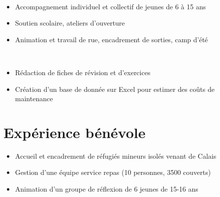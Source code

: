 \documentclass[]{cv-template}
\begin{document}
\begin{minipage}[t]{0.65\textwidth}
 \\
\begin{itemize}
\item Accompagnement individuel et collectif de jeunes de 6 à 15 ans
\item Soutien scolaire, ateliers d'ouverture
\item Animation et travail de rue, encadrement de sorties, camp d'été
\end{itemize}
\sectionsep

\\
\begin{itemize}
\item Rédaction de fiches de révision et d'exercices
\end{itemize}
\sectionsep

\begin{itemize}
\item Création d'un base de donnée sur Excel pour estimer des coûts de
  maintenance
\end{itemize}
\sectionsep

\section{Expérience bénévole}
\hfill{}
\begin{itemize}
\item Accueil et encadrement de réfugiés mineurs isolés venant de Calais
\end{itemize}

\hfill{}
\begin{itemize}
\item Gestion d'une équipe service repas (10 personnes, 3500 couverts)
\item Animation d'un groupe de réflexion de 6 jeunes de 15-16 ans
\end{itemize}


\end{minipage} 
\end{document}
